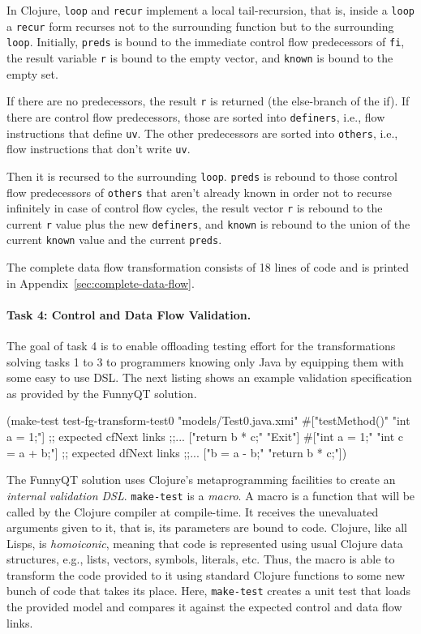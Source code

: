 \documentclass[submission]{eptcs}
\begin{document}
In Clojure, \verb|loop| and \verb|recur| implement a local tail-recursion, that
is, inside a \verb|loop| a \verb|recur| form recurses not to the surrounding
function but to the surrounding \verb|loop|.  Initially, \verb|preds| is bound
to the immediate control flow predecessors of \verb|fi|, the result variable
\verb|r| is bound to the empty vector, and \verb|known| is bound to the empty
set.

If there are no predecessors, the result \verb|r| is returned (the else-branch
of the if).  If there are control flow predecessors, those are sorted into
\verb|definers|, i.e., flow instructions that define \verb|uv|.  The other
predecessors are sorted into \verb|others|, i.e., flow instructions that don't
write \verb|uv|.

Then it is recursed to the surrounding \verb|loop|.  \verb|preds| is rebound to
those control flow predecessors of \verb|others| that aren't already known in
order not to recurse infinitely in case of control flow cycles, the result
vector \verb|r| is rebound to the current \verb|r| value plus the new
\verb|definers|, and \verb|known| is rebound to the union of the current
\verb|known| value and the current \verb|preds|.

The complete data flow transformation consists of 18 lines of code and is
printed in Appendix~\ref{sec:complete-data-flow}.


\paragraph{Task 4: Control and Data Flow Validation.}
\label{sec:task-4}

The goal of task 4 is to enable offloading testing effort for the
transformations solving tasks 1 to 3 to programmers knowing only Java by
equipping them with some easy to use DSL.  The next listing shows an example
validation specification as provided by the FunnyQT solution.

\begin{clojurecode}
(make-test test-fg-transform-test0 "models/Test0.java.xmi"
           #{["testMethod()"   "int a = 1;"]     ;; expected cfNext links
             ;;...
             ["return b * c;"  "Exit"]}
           #{["int a = 1;"     "int c = a + b;"] ;; expected dfNext links
             ;;...
             ["b = a - b;"     "return b * c;"]})
\end{clojurecode}

The FunnyQT solution uses Clojure's metaprogramming facilities to create an
\emph{internal validation DSL}.  \verb|make-test| is a \emph{macro}.  A macro
is a function that will be called by the Clojure compiler at compile-time.  It
receives the unevaluated arguments given to it, that is, its parameters are
bound to code.  Clojure, like all Lisps, is \emph{homoiconic}, meaning that
code is represented using usual Clojure data structures, e.g., lists, vectors,
symbols, literals, etc.  Thus, the macro is able to transform the code provided
to it using standard Clojure functions to some new bunch of code that takes its
place.  Here, \verb|make-test| creates a unit test that loads the provided
model and compares it against the expected control and data flow links.
\end{document}

